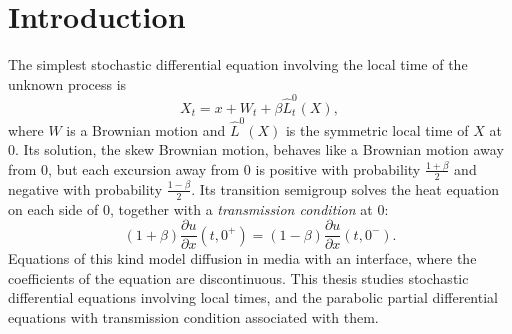\chapter*{Introduction}

The simplest stochastic differential equation involving the local time of the
unknown process is
\[
	X_t = x + W_t + \beta\hat{L}^0_t(X),
\]
where $W$ is a Brownian motion and $\hat{L}^0(X)$ is the symmetric local time
of $X$ at $0$. Its solution, the skew Brownian motion, behaves like a Brownian
motion away from $0$, but each excursion away from $0$ is positive with
probability $\frac{1+\beta}{2}$ and negative with probability
$\frac{1-\beta}{2}$. Its transition semigroup solves the heat equation on each
side of $0$, together with a \emph{transmission condition} at $0$:
\[
	(1+\beta)\frac{\partial u}{\partial x}(t,0^+) = (1-\beta)\frac{\partial u}{\partial x}(t,0^-).
\]
Equations of this kind model diffusion in media with an interface, where the
coefficients of the equation are discontinuous. This thesis studies
stochastic differential equations involving local times, and the parabolic
partial differential equations with transmission condition associated with
them.

